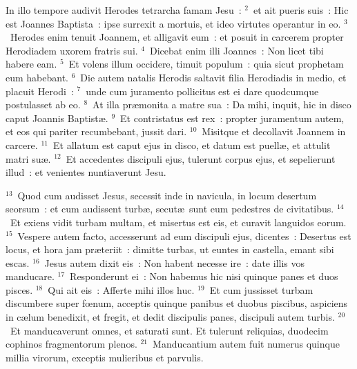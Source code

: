 \lettrine[lines=10,image=true,loversize=0.05,lraise=-0.03]{I}{}n illo tempore audivit Herodes tetrarcha famam Jesu~:
${}^{2}$~et ait pueris suis~: Hic est Joannes Baptista~: ipse surrexit a mortuis, et ideo virtutes operantur in eo.
${}^{3}$~Herodes enim tenuit Joannem, et alligavit eum~: et posuit in carcerem propter Herodiadem uxorem fratris sui.
${}^{4}$~Dicebat enim illi Joannes~: Non licet tibi habere eam.
${}^{5}$~Et volens illum occidere, timuit populum~: quia sicut prophetam eum habebant.
${}^{6}$~Die autem natalis Herodis saltavit filia Herodiadis in medio, et placuit Herodi~:
${}^{7}$~unde cum juramento pollicitus est ei dare quodcumque postulasset ab eo.
${}^{8}$~At illa pr\ae monita a matre sua~: Da mihi, inquit, hic in disco caput Joannis Baptist\ae .
${}^{9}$~Et contristatus est rex~: propter juramentum autem, et eos qui pariter recumbebant, jussit dari.
${}^{10}$~Misitque et decollavit Joannem in carcere.
${}^{11}$~Et allatum est caput ejus in disco, et datum est puell\ae , et attulit matri su\ae .
${}^{12}$~Et accedentes discipuli ejus, tulerunt corpus ejus, et sepelierunt illud~: et venientes nuntiaverunt Jesu.


${}^{13}$~Quod cum audisset Jesus, secessit inde in navicula, in locum desertum seorsum~: et cum audissent turb\ae , secut\ae\ sunt eum pedestres de civitatibus.
${}^{14}$~Et exiens vidit turbam multam, et misertus est eis, et curavit languidos eorum.
${}^{15}$~Vespere autem facto, accesserunt ad eum discipuli ejus, dicentes~: Desertus est locus, et hora jam pr\ae teriit~: dimitte turbas, ut euntes in castella, emant sibi escas.
${}^{16}$~Jesus autem dixit eis~: Non habent necesse ire~: date illis vos manducare.
${}^{17}$~Responderunt ei~: Non habemus hic nisi quinque panes et duos pisces.
${}^{18}$~Qui ait eis~: Afferte mihi illos huc.
${}^{19}$~Et cum jussisset turbam discumbere super fœnum, acceptis quinque panibus et duobus piscibus, aspiciens in c\ae lum benedixit, et fregit, et dedit discipulis panes, discipuli autem turbis.
${}^{20}$~Et manducaverunt omnes, et saturati sunt. Et tulerunt reliquias, duodecim cophinos fragmentorum plenos.
${}^{21}$~Manducantium autem fuit numerus quinque millia virorum, exceptis mulieribus et parvulis.


